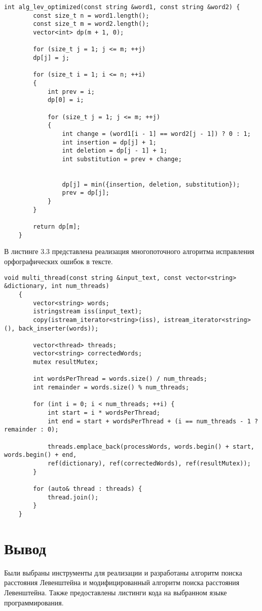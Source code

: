 \begin{lstlisting}[caption=Модифицированный алгоритм поиска расстояния Левенштейна]
	int alg_lev_optimized(const string &word1, const string &word2) {
		const size_t n = word1.length();
		const size_t m = word2.length();
		vector<int> dp(m + 1, 0);
		
		for (size_t j = 1; j <= m; ++j)
		dp[j] = j;
		
		for (size_t i = 1; i <= n; ++i) 
		{
			int prev = i;  
			dp[0] = i;     
			
			for (size_t j = 1; j <= m; ++j) 
			{
				int change = (word1[i - 1] == word2[j - 1]) ? 0 : 1;
				int insertion = dp[j] + 1;
				int deletion = dp[j - 1] + 1;
				int substitution = prev + change;
				
				
				dp[j] = min({insertion, deletion, substitution});
				prev = dp[j];
			}
		}
		
		return dp[m];
	}
\end{lstlisting}

\clearpage

В листинге 3.3 представлена реализация многопоточного алгоритма исправления орфографических ошибок в тексте.

\begin{lstlisting}[caption=Многопоточный алгоритм исправления орфографических ошибок в тексте]
	void multi_thread(const string &input_text, const vector<string> &dictionary, int num_threads) 
	{
		vector<string> words;
		istringstream iss(input_text);
		copy(istream_iterator<string>(iss), istream_iterator<string>(), back_inserter(words));
		
		vector<thread> threads;
		vector<string> correctedWords;
		mutex resultMutex;
		
		int wordsPerThread = words.size() / num_threads;
		int remainder = words.size() % num_threads;
		
		for (int i = 0; i < num_threads; ++i) {
			int start = i * wordsPerThread;
			int end = start + wordsPerThread + (i == num_threads - 1 ? remainder : 0);
			
			threads.emplace_back(processWords, words.begin() + start, words.begin() + end,
			ref(dictionary), ref(correctedWords), ref(resultMutex));
		}
		
		for (auto& thread : threads) {
			thread.join();
		}
	}
\end{lstlisting}

\section*{Вывод}

Были выбраны инструменты для реализации и разработаны алгоритм поиска расстояния Левенштейна и модифицированный алгоритм поиска расстояния Левенштейна.
Также предоставлены листинги кода на выбранном языке программирования.